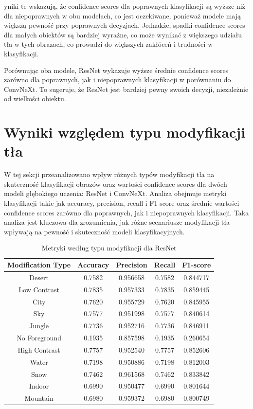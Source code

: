 yniki te wskazują, że confidence scores dla poprawnych klasyfikacji są wyższe niż dla niepoprawnych w obu modelach, co jest oczekiwane, 
ponieważ modele mają większą pewność przy poprawnych decyzjach. Jednakże, spadki confidence scores dla małych obiektów są bardziej wyraźne, 
co może wynikać z większego udziału tła w tych obrazach, co prowadzi do większych zakłóceń i trudności w klasyfikacji.

Porównując oba modele, ResNet wykazuje wyższe średnie confidence scores zarówno dla poprawnych, jak i niepoprawnych klasyfikacji w porównaniu 
do ConvNeXt. To sugeruje, że ResNet jest bardziej pewny swoich decyzji, niezależnie od wielkości obiektu.

\section*{Wyniki względem typu modyfikacji tła}

W tej sekcji przeanalizowano wpływ różnych typów modyfikacji tła na skuteczność klasyfikacji obrazów oraz wartości confidence scores dla dwóch 
modeli głębokiego uczenia: ResNet i ConvNeXt. Analiza obejmuje metryki klasyfikacji takie jak accuracy, precision, recall i F1-score oraz 
średnie wartości confidence scores zarówno dla poprawnych, jak i niepoprawnych klasyfikacji. Taka analiza jest kluczowa dla zrozumienia, jak 
różne scenariusze modyfikacji tła wpływają na pewność i skuteczność modeli klasyfikacyjnych.

\begin{table}
	\centering
	\begin{tabular}{|c|c|c|c|c|}
		\hline
		\textbf{Modification Type} & \textbf{Accuracy} & \textbf{Precision} & \textbf{Recall} & \textbf{F1-score} \\
		\hline
		Desert & 0.7582 & 0.956658 & 0.7582 & 0.844717 \\
		\hline
		Low Contrast & 0.7835 & 0.957333 & 0.7835 & 0.859445 \\
		\hline
		City & 0.7620 & 0.955729 & 0.7620 & 0.845955 \\
		\hline
		Sky & 0.7577 & 0.951998 & 0.7577 & 0.840614 \\
		\hline
		Jungle & 0.7736 & 0.952716 & 0.7736 & 0.846911 \\
		\hline
		No Foreground & 0.1935 & 0.857598 & 0.1935 & 0.260654 \\
		\hline
		High Contrast & 0.7757 & 0.952540 & 0.7757 & 0.852606 \\
		\hline
		Water & 0.7198 & 0.950886 & 0.7198 & 0.812003 \\
		\hline
		Snow & 0.7462 & 0.961568 & 0.7462 & 0.833842 \\
		\hline
		Indoor & 0.6990 & 0.950477 & 0.6990 & 0.801644 \\
		\hline
		Mountain & 0.6980 & 0.959372 & 0.6980 & 0.800749 \\
		\hline
	\end{tabular}
	\caption{Metryki według typu modyfikacji dla ResNet}
	\label{tab:resnet_metrics_modification}
\end{table}

